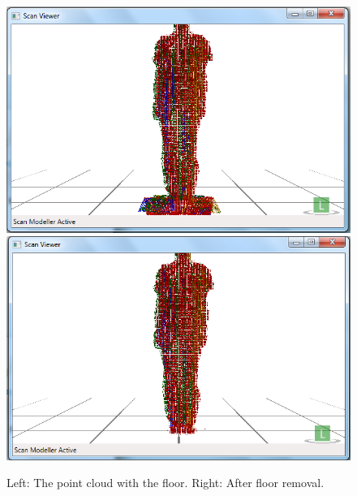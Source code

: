 \begin{figure}[h]
\begin{center}
\includegraphics[scale=0.3]{images/greg_feet}
\includegraphics[scale=0.3]{images/greg_nofeet} 
\end{center}
\caption{Left: The point cloud with the floor. Right: After floor removal.}
\label{fig:floor removal}
\end{figure} 